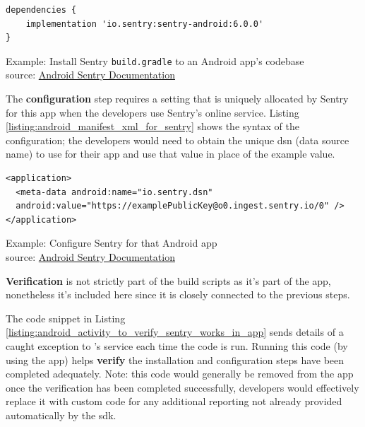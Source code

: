 \begin{listing}
\begin{verbatim}
dependencies {
    implementation 'io.sentry:sentry-android:6.0.0'
}
\end{verbatim}
\caption{Example: Install Sentry \texttt{build.gradle} to an Android app's codebase\\source: \href{https://docs.sentry.io/platforms/android/}{Android Sentry Documentation}}
\label{listing:build_gradle_for_sentry}
\end{listing}

The \textbf{configuration} step requires a setting that is uniquely allocated by Sentry for this app when the developers use Sentry's online service. Listing \ref{listing:android_manifest_xml_for_sentry} shows the syntax of the configuration; the developers would need to obtain the unique dsn (data source name) to use for their app and use that value in place of the example value.

\begin{listing}
\begin{verbatim}
<application>
  <meta-data android:name="io.sentry.dsn"
  android:value="https://examplePublicKey@o0.ingest.sentry.io/0" />
</application>
\end{verbatim}
\caption{Example: Configure Sentry for that Android app\\source: \href{https://docs.sentry.io/platforms/android/}{Android Sentry Documentation}}
\label{listing:android_manifest_xml_for_sentry}
\end{listing}

\textbf{Verification} is not strictly part of the build scripts as it's part of the app, nonetheless it's included here since it is closely connected to the previous steps.

The code snippet in Listing \ref{listing:android_activity_to_verify_sentry_works_in_app} sends details of a caught exception to 's service each time the code is run. Running this code (by using the app) helps \textbf{verify} the installation and configuration steps have been completed adequately. Note: this code would generally be removed from the app once the verification has been completed successfully, developers would effectively replace it with custom code for any additional reporting not already provided automatically by the \Gls{sdk}. %

